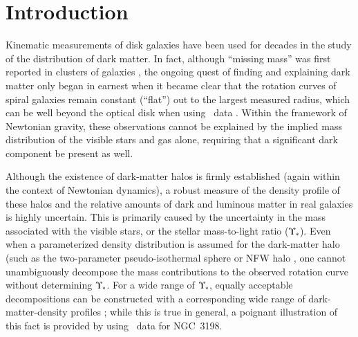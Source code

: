 \documentclass[traditabstract]{aa} %
\begin{document}

   \maketitle



\section{Introduction}
\label{sec:intro}

Kinematic measurements of disk galaxies have been used for decades in the study
of the distribution of dark matter.  In fact, although ``missing mass'' was
first reported in clusters of galaxies \citep{zwicky1933}, the ongoing quest of
finding and explaining dark matter only began in earnest when it became clear
that the rotation curves of spiral galaxies remain constant (``flat'') out to
the largest measured radius, which can be well beyond the optical disk when
using \hone\ data \citep[early observations include][]{roberts1966, rogstad1972,
bosma1978, bosma1981a, bosma1981b, rubin1980}.  Within the framework of
Newtonian gravity, these observations cannot be explained by the implied mass
distribution of the visible stars and gas alone, requiring that a significant
dark component be present as well.

Although the existence of dark-matter halos is firmly established (again within
the context of Newtonian dynamics), a robust measure of the density profile of
these halos and the relative amounts of dark and luminous matter in real
galaxies is highly uncertain.  This is primarily caused by the uncertainty in
the mass associated with the visible stars, or the stellar mass-to-light ratio
($\Upsilon_\ast$).  Even when a parameterized density distribution is assumed for the
dark-matter halo (such as the two-parameter pseudo-isothermal sphere
\citep[e.g.][]{ostriker1979} or NFW halo \citep{NFW1997}, one cannot
unambiguously decompose the mass contributions to the observed rotation curve
without determining $\Upsilon_\ast$.  For a wide range of $\Upsilon_\ast$, equally acceptable
decompositions can be constructed with a corresponding wide range of
dark-matter-density profiles \citep[e.g.][]{albada1985,verheyen1997,dutton2005};
while this is true in general, a poignant illustration of this fact is provided
by \citet[][hereafter ]{bershady2010a} using \hone\
data for NGC~3198.
\end{document}
